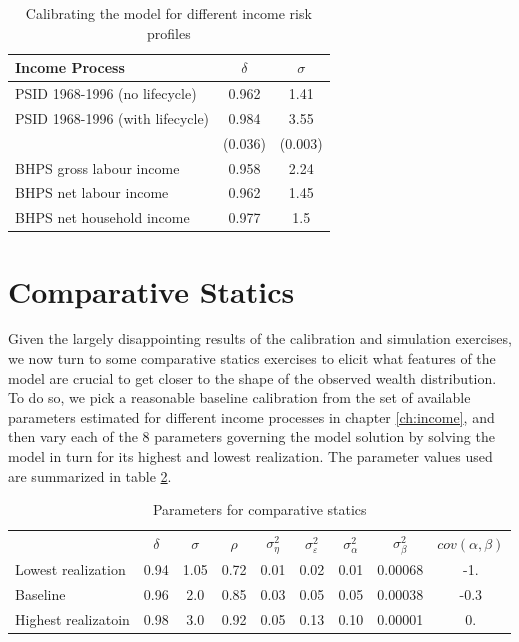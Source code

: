 \begin{table}%
\begin{tabular}{|l|c|c|}
\hline
       Income Process            & $\delta$ & $\sigma$ \\
\hline                          
PSID 1968-1996 (no lifecycle)    &  0.962 & 1.41    \\
PSID 1968-1996 (with lifecycle)  &  0.984 & 3.55    \\
                           & \footnotesize{(0.036)} & \footnotesize{(0.003)} \\
BHPS gross labour income         &  0.958 & 2.24    \\
BHPS net labour income           &  0.962 & 1.45    \\
BHPS net household income        &  0.977 & 1.5     \\
\hline
\end{tabular}
\caption{Calibrating the model for different income risk profiles}
\label{tab:calibration_results}
\end{table} 

\pagebreak
\section{Comparative Statics}\label{sec:comp_stats}
Given the largely disappointing results of the calibration and simulation exercises,
we now turn to some comparative statics exercises to elicit what features of the 
model are crucial to get closer to the shape of the observed wealth distribution.
To do so, we pick a reasonable baseline calibration from the set of available 
parameters estimated for different income processes in chapter \ref{ch:income}, 
and then vary each of the 8 parameters governing the model solution by solving 
the model in turn for its highest and lowest realization. The parameter values
used are summarized in table \ref{tab:comp_stat_parameters}. 

\begin{table}%
\begin{tabular}{|l|cccccccc|}
                  & $\delta$ & $\sigma$ & $\rho$ & $\sigma^2_{\eta}$ & $\sigma^2_{\varepsilon}$ & $\sigma^2_{\alpha}$ & $\sigma^2_{\beta}$ & $cov(\alpha,\beta)$ \\
Lowest realization  &  0.94  &  1.05  & 0.72   &    0.01           &    0.02                  &     0.01            &      0.00068       &    -1.     \\
Baseline            &  0.96  &  2.0   & 0.85   &    0.03           &    0.05                  &     0.05            &      0.00038       &    -0.3    \\
Highest realizatoin &  0.98  &  3.0   & 0.92   &    0.05           &    0.13                  &     0.10            &      0.00001       &     0.     \\
\end{tabular}
\caption{Parameters for comparative statics}
\label{tab:comp_stat_parameters}
\end{table}

